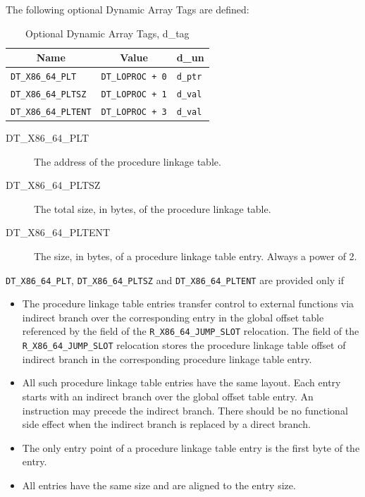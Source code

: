 The following optional \xARCH Dynamic Array Tags are defined:

\begin{table}[H]
\Hrule
  \caption{Optional Dynamic Array Tags, d_tag}
  \begin{center}
    \begin{tabular}[t]{l|l|l}
      \multicolumn{1}{c}{Name} & \multicolumn{1}{c}{Value} &
        \multicolumn{1}{c}{d_un} \\
      \hline
      \texttt{DT_X86_64_PLT} & \texttt{DT_LOPROC + 0} & \texttt{d_ptr} \\
      \texttt{DT_X86_64_PLTSZ} & \texttt{DT_LOPROC + 1} & \texttt{d_val} \\
      \texttt{DT_X86_64_PLTENT} & \texttt{DT_LOPROC + 3} & \texttt{d_val} \\
    \end{tabular}
  \end{center}
\Hrule
\end{table}

\begin{description}
 \item[DT_X86_64_PLT]
   The address of the procedure linkage table.
 \item[DT_X86_64_PLTSZ]
   The total size, in bytes, of the procedure linkage table.
 \item[DT_X86_64_PLTENT]
   The size, in bytes, of a procedure linkage table entry. Always a
   power of 2.
\end{description}

\texttt{DT_X86_64_PLT}, \texttt{DT_X86_64_PLTSZ} and
\texttt{DT_X86_64_PLTENT} are provided only if

\begin{itemize}
 \item The procedure linkage table entries transfer control to external
  functions via indirect branch over the corresponding entry in the global
  offset table referenced by the  field of the
  \texttt{R_X86_64_JUMP_SLOT} relocation.  The  field of
  the \texttt{R_X86_64_JUMP_SLOT} relocation stores the procedure linkage
  table offset of indirect branch in the corresponding procedure linkage
  table entry.
  \item All such procedure linkage table entries have the same layout.
   Each entry starts with an indirect branch over the global offset table
   entry.  An  instruction may precede the indirect branch.
   There should be no functional side effect when the indirect branch is
   replaced by a direct branch.
  \item The only entry point of a procedure linkage table entry is the
   first byte of the entry.
  \item All entries have the same size and are aligned to the entry size.
\end{itemize}

